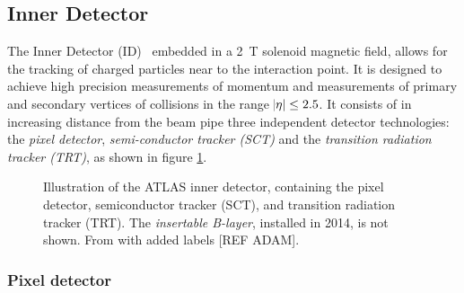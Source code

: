 \subsection{Inner Detector}\label{sec:method:ID}

The Inner Detector (ID)~\cite{ATLAS:ID-TDR} embedded in a \SI{2}{\tesla} solenoid magnetic field, allows for the tracking of charged particles near to the interaction point. It is designed to achieve high precision measurements of momentum and measurements of primary and secondary vertices of collisions in the range $\abs{\eta} \leq 2.5$. It consists of in increasing distance from the beam pipe three independent detector technologies: the \emph{pixel detector}, \emph{semi-conductor tracker (SCT)} and the \emph{transition radiation tracker (TRT)}, as shown in figure \cref{fig:method:ATLAS:ID}. 

\begin{figure}
    \centering
    \caption[Illustration of the ATLAS inner detector]{Illustration of the ATLAS inner detector, containing the pixel detector, semiconductor tracker (SCT), and transition radiation tracker (TRT). The \emph{insertable B-layer}, installed in 2014, is not shown. From \cite{ATLASIDImage} with added labels [REF ADAM].}
    \label{fig:method:ATLAS:ID}
\end{figure}

\subsubsection{Pixel detector}

